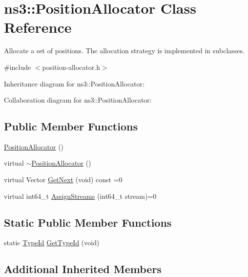 \hypertarget{classns3_1_1PositionAllocator}{}\section{ns3\+:\+:Position\+Allocator Class Reference}
\label{classns3_1_1PositionAllocator}


Allocate a set of positions. The allocation strategy is implemented in subclasses.  




{\ttfamily \#include $<$position-\/allocator.\+h$>$}



Inheritance diagram for ns3\+:\+:Position\+Allocator\+:


Collaboration diagram for ns3\+:\+:Position\+Allocator\+:
\subsection*{Public Member Functions}
\begin{DoxyCompactItemize}
\item 
\hyperlink{classns3_1_1PositionAllocator_a944cf6b97b874e06983c1f3e81cf3ea6}{Position\+Allocator} ()
\item 
virtual \hyperlink{classns3_1_1PositionAllocator_aadc8e564e1c95dae94e97014d24a980c}{$\sim$\+Position\+Allocator} ()
\item 
virtual Vector \hyperlink{classns3_1_1PositionAllocator_ab1d9ba3b655b9f83f4cf738ff06fbd6f}{Get\+Next} (void) const =0
\item 
virtual int64\+\_\+t \hyperlink{classns3_1_1PositionAllocator_a654c787e42def6e4463731d50b337057}{Assign\+Streams} (int64\+\_\+t stream)=0
\end{DoxyCompactItemize}
\subsection*{Static Public Member Functions}
\begin{DoxyCompactItemize}
\item 
static \hyperlink{classns3_1_1TypeId}{Type\+Id} \hyperlink{classns3_1_1PositionAllocator_ac7d391df1590b98d3a4446f952cedd06}{Get\+Type\+Id} (void)
\end{DoxyCompactItemize}
\subsection*{Additional Inherited Members}


